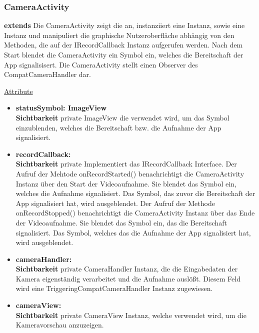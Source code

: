 \subsubsection{CameraActivity} \label{app:klasse:CameraActivity}
\textbf{extends}  \newline
Die CameraActivity zeigt die  an, instanziiert eine  Instanz, sowie eine  Instanz und manipuliert die graphische Nutzeroberfläche abhängig von den Methoden, die auf der IRecordCallback Instanz aufgerufen werden. Nach dem Start blendet die CameraActivity ein Symbol ein, welches die Bereitschaft der App signalisisert. Die CameraActivity stellt einen Observer des CompatCameraHandler dar.
\newline

\underline{Attribute}
\begin{itemize}
\itemsep0pt

\item \textbf{statusSymbol: ImageView} \hfill\\ 
\textbf{Sichtbarkeit} private\newline
ImageView die verwendet wird, um das Symbol einzublenden, welches die Bereitschaft bzw. die Aufnahme der App signalisiert.

\item \textbf{recordCallback: } \hfill\\ 
\textbf{Sichtbarkeit} private\newline
Implementiert das IRecordCallback Interface. 
Der Aufruf der Mehtode onRecordStarted() benachrichtigt die CameraActivity Instanz über den Start der Videoaufnahme. Sie blendet das Symbol ein, welches die Aufnahme signalisiert. Das Symbol, das zuvor die Bereitschaft der App signalisiert hat, wird ausgeblendet.
Der Aufruf der Methode onRecordStopped() benachrichtigt die CameraActivity Instanz über das Ende der Videoaufnahme. Sie blendet das Symbol ein, das die Bereitschaft signalisiert. Das Symbol, welches das die Aufnahme der App signalisiert hat, wird ausgeblendet.

\item \textbf{cameraHandler: } \hfill\\ 
\textbf{Sichtbarkeit} private\newline
CameraHandler Instanz, die die Eingabedaten der Kamera eigenständig verarbeitet und die Aufnahme auslößt. Diesem Feld wird eine TriggeringCompatCameraHandler Instanz zugewiesen.

\item \textbf{cameraView: } \hfill\\ 
\textbf{Sichtbarkeit} private\newline
CameraView Instanz, welche verwendet wird, um die Kameravorschau anzuzeigen.

\end{itemize}

